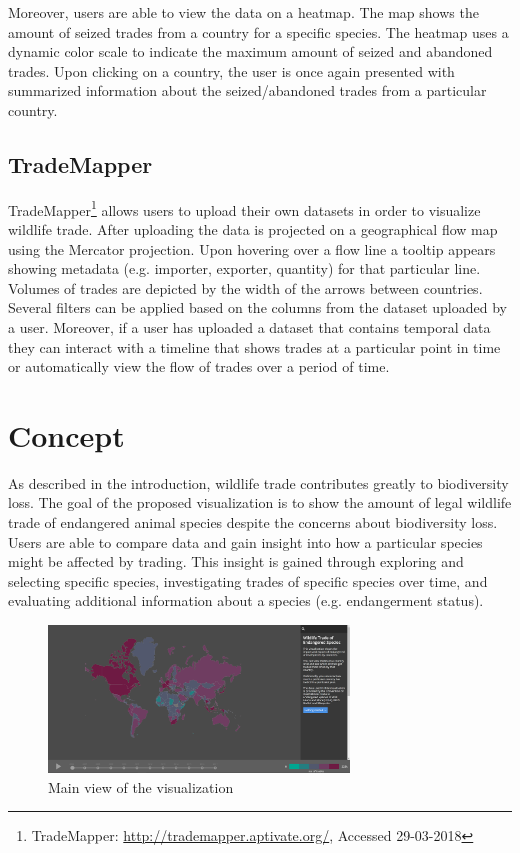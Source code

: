 Moreover, users are able to view the data on a heatmap. The map shows the amount of seized trades from a country for a specific species. The heatmap uses a dynamic color scale to indicate the maximum amount of seized and abandoned trades. Upon clicking on a country, the user is once again presented with summarized information about the seized/abandoned trades from a particular country.

\subsection{TradeMapper}
TradeMapper\footnote{TradeMapper: \url{http://trademapper.aptivate.org/}, Accessed 29-03-2018} allows users to upload their own datasets in order to visualize wildlife trade. After uploading the data is projected on a geographical flow map using the Mercator projection. Upon hovering over a flow line a tooltip appears showing metadata (e.g. importer, exporter, quantity) for that particular line. Volumes of trades are depicted by the width of the arrows between countries. Several filters can be applied based on the columns from the dataset uploaded by a user. Moreover, if a user has uploaded a dataset that contains temporal data they can interact with a timeline that shows trades at a particular point in time or automatically view the flow of trades over a period of time.

\section{Concept} \label{concept}
As described in the introduction, wildlife trade contributes greatly to biodiversity loss. The goal of the proposed visualization is to show the amount of legal wildlife trade of endangered animal species despite the concerns about biodiversity loss. Users are able to compare data and gain insight into how a particular species might be affected by trading. This insight is gained through exploring and selecting specific species, investigating trades of specific species over time, and evaluating additional information about a species (e.g. endangerment status).

\begin{figure} [h]
\centering
\includegraphics[width=8cm]{images/vis_main.png}
\caption{Main view of the visualization}
\label{vis_main_img}
\end{figure}


